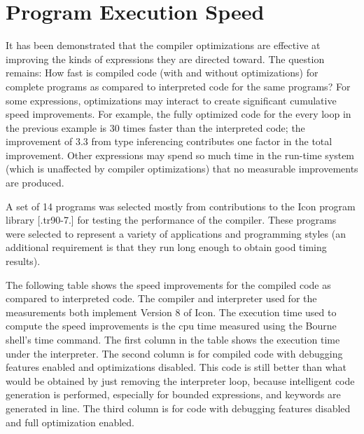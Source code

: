 \section{Program Execution Speed}

It has been demonstrated that the compiler optimizations are effective
at improving the kinds of expressions they are directed toward. The
question remains: How fast is compiled code (with and without
optimizations) for complete programs as compared to interpreted code
for the same programs? For some expressions, optimizations may
interact to create significant cumulative speed improvements. For
example, the fully optimized code for the every loop in the previous
example is 30 times faster than the interpreted code; the improvement
of 3.3 from type inferencing contributes one factor in the total
improvement. Other expressions may spend so much time in the run-time
system (which is unaffected by compiler optimizations) that no
measurable improvements are produced.

A set of 14 programs was selected mostly from contributions to the
Icon program library [.tr90-7.] for testing the performance of the
compiler. These programs were selected to represent a variety of
applications and programming styles (an additional requirement is that
they run long enough to obtain good timing results).

The following table shows the speed improvements for the compiled code
as compared to interpreted code. The compiler and interpreter used for
the measurements both implement Version 8 of Icon. The execution time
used to compute the speed improvements is the cpu time measured using
the Bourne shell's time command. The first column in the table shows
the execution time under the interpreter. The second column is for
compiled code with debugging features enabled and optimizations
disabled. This code is still better than what would be obtained by
just removing the interpreter loop, because intelligent code
generation is performed, especially for bounded expressions, and
keywords are generated in line. The third column is for code with
debugging features disabled and full optimization enabled.


